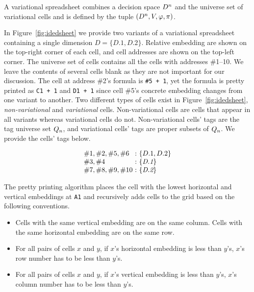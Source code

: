 \documentclass[conference]{IEEEtran}
\def\OB#1{\ifmmode#1\else\mbox{$#1$}\fi}
\newcommand{\set}[1]{\ensuremath{\{#1\}}}
\newcommand{\prog}[1]{{\small\texttt{#1}}}
\newcommand{\dimset}[1][D]{\OB{#1^n}}
\newcommand{\decstr}{\OB{{\cal D}}}
\newcommand{\qt}[1][\decstr]{\OB{Q_{#1}}}
\newcommand{\mapname}[1]{\textit{#1}}
\newcommand{\dset}[1]{\{#1\}}
\newcommand{\gcell}[1]{\##1}
\newcommand{\posSym}{\OB{\pi}}
\newcommand{\varSym}{\OB{V}}
\newcommand{\fmlSym}{\OB{\varphi}}
\begin{document}
A variational spreadsheet combines a decision space $\dimset$ and the 
universe set of variational cells and is defined by the tuple $(\dimset, 
\varSym, \fmlSym, \posSym)$. 

In Figure~\ref{fig:idedsheet} we provide two variants of a variational 
spreadsheet containing a single dimension $\mapname{D} = \set{D.1, 
D.2}$. Relative embedding are shown on the top-right corner of each 
cell, and cell addresses are shown on the top-left corner. The universe 
set of cells contains all the cells with addresses \gcell{1--10}. We 
leave the contents of several cells blank as they are not important for 
our discussion. The cell at address \gcell{2}'s formula is \prog{\#5 + 
1}, yet the formula is pretty printed as \prog{C1 + 1} and \prog{D1 + 1} 
since cell \gcell{5}'s concrete embedding changes from one variant to 
another. Two different types of cells exist in 
Figure~\ref{fig:idedsheet}, \emph{non-variational} and 
\emph{variational} cells. Non-variational cells are cells that appear in 
all variants whereas variational cells do not. Non-variational cells' 
tags are the tag universe set $\qt[n]$, and variational cells' tags are 
proper subsets of $\qt[n]$. We provide the cells' tags below. 

\[
\begin{array}{l@{\ : \ }l}
    \gcell{1}, \gcell{2}, \gcell{5}, \gcell{6} & \set{D.1, D.2} \\
    \gcell{3}, \gcell{4} & \dset{\mapname{D.1}} \\
    \gcell{7}, \gcell{8}, \gcell{9}, \gcell{10} & \dset{\mapname{D.2}} \\
\end{array}
\]

The pretty printing algorithm places the cell with the lowest horizontal 
and vertical embeddings at \prog{A1} and recursively adds cells to the 
grid based on the following conventions. 

\begin{itemize}
    \item Cells with the same vertical embedding are on the same column. 
    Cells with the same horizontal embedding are on the same row. 
    \item For all pairs of cells $x$ and $y$, if $x$'s horizontal embedding 
    is less than $y$'s, $x$'s row number has to be less than $y$'s. 
    \item For all pairs of cells $x$ and $y$, if $x$'s vertical embedding is 
    less than $y$'s, $x$'s column number has to be less than $y$'s. 
\end{itemize}
\end{document}
